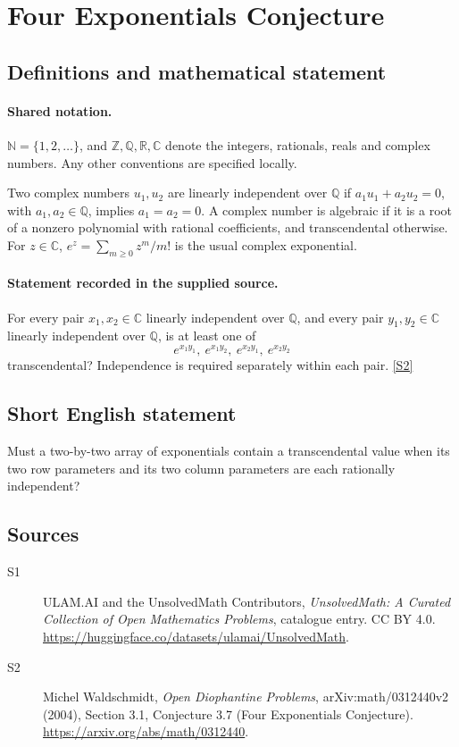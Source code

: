 \documentclass[11pt]{article}
\newcommand{\sref}[2]{\hyperlink{source:#1:#2}{[S#2]}}
\begin{document}
\section{Four Exponentials Conjecture}\label{statement}

\subsection{Definitions and mathematical statement}

\paragraph{Shared notation.}$\mathbb N=\{1,2,\ldots\}$, and $\mathbb Z,\mathbb Q,\mathbb R,\mathbb C$ denote the integers, rationals, reals and complex numbers. Any other conventions are specified locally.


Two complex numbers \(u_1,u_2\) are linearly independent over
\(\mathbb Q\) if \(a_1u_1+a_2u_2=0\), with
\(a_1,a_2\in\mathbb Q\), implies \(a_1=a_2=0\).
A complex number is algebraic if it is a root of a nonzero polynomial
with rational coefficients, and transcendental otherwise.
For \(z\in\mathbb C\), \(e^z=\sum_{m\ge0}z^m/m!\) is the
usual complex exponential.
\paragraph{Statement recorded in the supplied source.}
For every pair \(x_1,x_2\in\mathbb C\) linearly independent over
\(\mathbb Q\), and every pair \(y_1,y_2\in\mathbb C\) linearly
independent over \(\mathbb Q\), is at least one of
\[
             e^{x_1y_1},\ e^{x_1y_2},\ e^{x_2y_1},\ e^{x_2y_2}
\]
transcendental? Independence is required separately within each pair. \sref{statement}{2}
\subsection{Short English statement}
Must a two-by-two array of exponentials contain a transcendental value when its two row parameters and its two column parameters are each rationally independent?
\subsection{Sources}
\begin{description}
\item[\hypertarget{source:statement:1}{S1}] ULAM.AI and the UnsolvedMath Contributors, \emph{UnsolvedMath: A Curated Collection of Open Mathematics Problems}, catalogue entry. CC BY 4.0. \url{https://huggingface.co/datasets/ulamai/UnsolvedMath}.
\item[\hypertarget{source:statement:2}{S2}] Michel Waldschmidt, \emph{Open Diophantine Problems}, arXiv:math/0312440v2 (2004), Section 3.1, Conjecture 3.7 (Four Exponentials Conjecture). \url{https://arxiv.org/abs/math/0312440}.
\end{description}
\label{end:statement}
\end{document}
